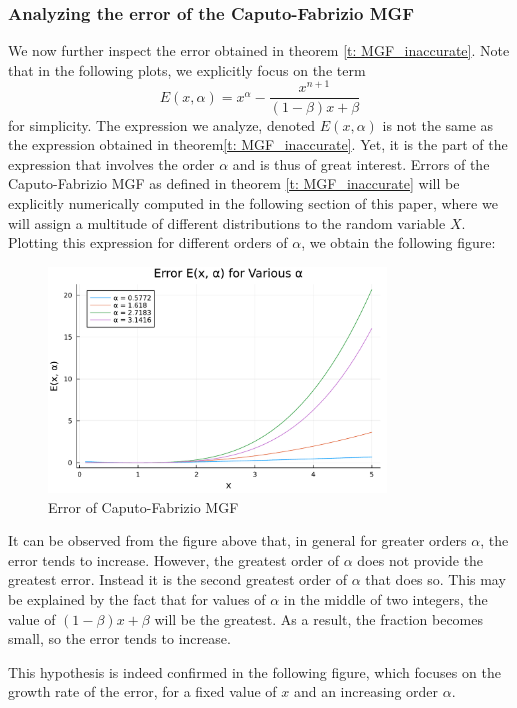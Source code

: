 \subsubsection{Analyzing the error of the Caputo-Fabrizio MGF}
We now further inspect the error obtained in theorem \ref{t: MGF_inaccurate}. Note that in the following plots, we explicitly focus on the term \[ E(x, \alpha) = x^\alpha - \displaystyle \frac{x^{n+1} }{(1 - \beta)x + \beta}\] for simplicity. The expression we analyze, denoted \(E(x, \alpha)\) is not the same as the expression obtained in theorem\ref{t: MGF_inaccurate}. Yet, it is the part of the expression that involves the order \(\alpha\) and is thus of great interest. Errors of the Caputo-Fabrizio MGF as defined in theorem \ref{t: MGF_inaccurate} will be explicitly numerically computed in the following section of this paper, where we will assign a multitude of different distributions to the random variable \(X\). Plotting this expression for different orders of \(\alpha\), we obtain the following figure:
\begin{figure}[H]
    \centering
    \includegraphics[width=0.8\textwidth]{figures/error_plot.pdf}
    \caption{Error of Caputo-Fabrizio MGF}
    \label{fig:error_MGF}
\end{figure}
It can be observed from the figure above that, in general for greater orders \(\alpha\), the error tends to increase. However, the greatest order of \(\alpha\) does not provide the greatest error. Instead it is the second greatest order of \(\alpha\) that does so. This may be explained by the fact that for values of \(\alpha\) in the middle of two integers, the value of \((1 - \beta)x + \beta\) will be the greatest. As a result, the fraction becomes small, so the error tends to increase.

This hypothesis is indeed confirmed in the following figure, which focuses on the growth rate of the error, for a fixed value of \(x\) and an increasing order \(\alpha\).

